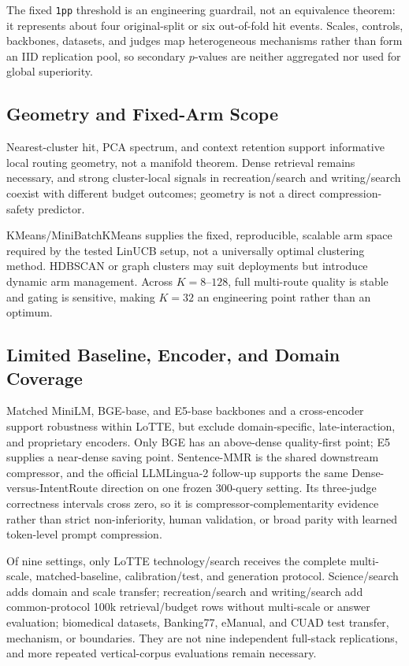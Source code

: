 The fixed \nolinkurl{1pp} threshold is an engineering guardrail, not an equivalence theorem: it represents about four original-split or six out-of-fold hit events. Scales, controls, backbones, datasets, and judges map heterogeneous mechanisms rather than form an IID replication pool, so secondary $p$-values are neither aggregated nor used for global superiority.

\subsection{Geometry and Fixed-Arm Scope}
\label{sec:08-limitations:geometry-and-fixed-arm-scope}

Nearest-cluster hit, PCA spectrum, and context retention support informative local routing geometry, not a manifold theorem. Dense retrieval remains necessary, and strong cluster-local signals in recreation/search and writing/search coexist with different budget outcomes; geometry is not a direct compression-safety predictor.

KMeans/MiniBatchKMeans supplies the fixed, reproducible, scalable arm space required by the tested LinUCB setup, not a universally optimal clustering method. HDBSCAN or graph clusters may suit deployments but introduce dynamic arm management. Across $K=8$--$128$, full multi-route quality is stable and gating is sensitive, making $K=32$ an engineering point rather than an optimum.

\subsection{Limited Baseline, Encoder, and Domain Coverage}
\label{sec:08-limitations:limited-baseline-encoder-and-domain-coverage}

Matched MiniLM, BGE-base, and E5-base backbones and a cross-encoder support robustness within LoTTE, but exclude domain-specific, late-interaction, and proprietary encoders. Only BGE has an above-dense quality-first point; E5 supplies a near-dense saving point. Sentence-MMR is the shared downstream compressor, and the official LLMLingua-2 follow-up supports the same Dense-versus-IntentRoute direction on one frozen 300-query setting. Its three-judge correctness intervals cross zero, so it is compressor-complementarity evidence rather than strict non-inferiority, human validation, or broad parity with learned token-level prompt compression.

Of nine settings, only LoTTE technology/search receives the complete multi-scale, matched-baseline, calibration/test, and generation protocol. Science/search adds domain and scale transfer; recreation/search and writing/search add common-protocol 100k retrieval/budget rows without multi-scale or answer evaluation; biomedical datasets, Banking77, eManual, and CUAD test transfer, mechanism, or boundaries. They are not nine independent full-stack replications, and more repeated vertical-corpus evaluations remain necessary.


